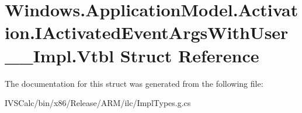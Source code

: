 \hypertarget{struct_windows_1_1_application_model_1_1_activation_1_1_i_activated_event_args_with_user_____impl_1_1_vtbl}{}\section{Windows.\+Application\+Model.\+Activation.\+I\+Activated\+Event\+Args\+With\+User\+\_\+\+\_\+\+Impl.\+Vtbl Struct Reference}
\label{struct_windows_1_1_application_model_1_1_activation_1_1_i_activated_event_args_with_user_____impl_1_1_vtbl}


The documentation for this struct was generated from the following file\+:\begin{DoxyCompactItemize}
\item 
I\+V\+S\+Calc/bin/x86/\+Release/\+A\+R\+M/ilc/Impl\+Types.\+g.\+cs\end{DoxyCompactItemize}
